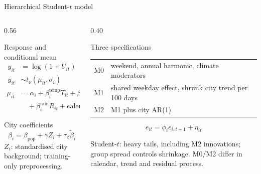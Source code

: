 \documentclass[aspectratio=169,11pt]{beamer}
\begin{document}
\begin{frame}{Hierarchical Student-$t$ model}
  \small
  \begin{columns}[T,onlytextwidth]
    \begin{column}{0.56\textwidth}
      \begin{block}{Response and conditional mean}
        \setlength{\abovedisplayskip}{6pt}
        \setlength{\belowdisplayskip}{6pt}
        \[
          \begin{aligned}
            y_{it} &= \log(1+U_{it})\\
            y_{it} &\sim t_\nu(\mu_{it},\sigma_i)
          \end{aligned}
        \]
        \[
          \begin{aligned}
            \mu_{it} &= \alpha_i
              +\beta^{\text{temp}}_iT_{it}
              +\beta^{\text{sq}}_iQ_{it}\\
              &\quad+\beta^{\text{rain}}_iR_{it}
              +\text{calendar}_{it}
              +\text{trend}_{it}
          \end{aligned}
        \]
      \end{block}
      \begin{block}{City coefficients}
        \[
          \beta_i=\beta_{\text{pop}}+\gamma Z_i+\tau_\beta\tilde\beta_i
        \]
        \footnotesize $Z_i$: standardised city background; training-only preprocessing.
      \end{block}
    \end{column}
    \begin{column}{0.40\textwidth}
      \begin{block}{Three specifications}
        \begin{tabularx}{\linewidth}{@{}lX@{}}
          M0 & weekend, annual harmonic, climate moderators \\[0.25em]
          M1 & shared weekday effect, shrunk city trend per 100 days \\[0.25em]
          M2 & M1 plus city AR(1)
        \end{tabularx}
        \[
          e_{it}=\phi_i e_{i,t-1}+\eta_{it}
        \]
      \end{block}
      \footnotesize Student-$t$: heavy tails, including M2 innovations; group spread controls shrinkage.
      M0/M2 differ in calendar, trend and residual process.
    \end{column}
  \end{columns}
\end{frame}
\end{document}
